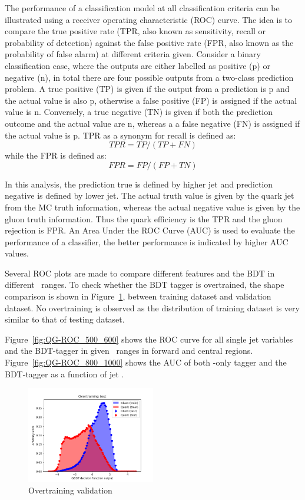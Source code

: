 The performance of a classification model at all classification criteria can be illustrated using a receiver operating characteristic (ROC) curve. The idea is to compare the true positive rate (TPR, also known as sensitivity, recall or probability of detection) against the false positive rate (FPR, also known as the probability of false alarm) at different criteria given. Consider a binary classification case, where the outputs are either labelled as positive (p) or negative (n), in total there are four possible outputs from a two-class prediction problem. A true positive (TP) is given if the output from a prediction is p and the actual value is also p, otherwise a false positive (FP) is assigned if the actual value is n. Conversely, a true negative (TN) is given if both the prediction outcome and the actual value are n, whereas a a false negative (FN) is assigned if the actual value is p. TPR as a synonym for recall is defined as:
\begin{equation}
	TPR = TP/(TP+FN)
\end{equation}
while the FPR is defined as: 
\begin{equation}
	FPR = FP/(FP+TN)
\end{equation}

In this analysis, the prediction true is defined by higher \abseta jet and prediction negative is defined by lower \abseta jet. The actual truth value is given by the quark jet from the MC truth information, whereas the actual negative value is given by the gluon truth information. Thus the quark efficiency is the TPR and the gluon rejection is FPR. An Area Under the ROC Curve (AUC) is used to evaluate the performance of a classifier, the better performance is indicated by higher AUC values.

Several ROC plots are made to compare different features and the BDT in different \pt~ranges. 
To check whether the BDT tagger is overtrained, the shape comparison is shown in Figure~\ref{fig:overtraining-validation}, between training dataset and validation dataset.  
No overtraining is observed as the distribution of training dataset is very similar to that of testing dataset. 

Figure~\ref{fig:QG-ROC_500_600} shows the ROC curve for all single jet variables and the BDT-tagger in given \pt~ranges in forward and central regions. Figure~\ref{fig:QG-ROC_800_1000}  shows the AUC of both \ntrk-only tagger and the BDT-tagger as a function of jet \pt. 
\begin{figure}[h]
	\centering
	\includegraphics[width=0.5\textwidth]{fig/ADE/new_GBDT/4vars_plots/overtrain_validation.png}
	\caption{Overtraining validation}
	\label{fig:overtraining-validation}
\end{figure}

